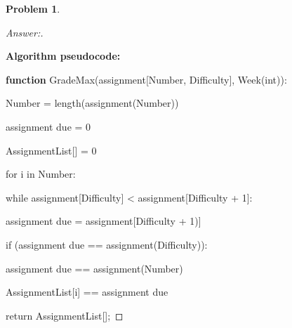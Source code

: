 \documentclass[11pt]{article}
\theoremstyle{definition}
\theoremstyle{definition}
\newtheorem{required}{Problem}
\theoremstyle{definition}
\begin{document}
\begin{required}
\begin{enumerate}[label=(\alph*)]
\begin{proof}[Answer:] \
\item \textbf{Algorithm pseudocode:}
\item \textbf{function} GradeMax(assignment[Number, Difficulty], Week(int)):									
	\item	\hspace*{10mm} Number = length(assignment(Number))
	\item	\hspace*{10mm} assignment due = 0
	\item	\hspace*{10mm} AssignmentList[] = 0

	\item	\hspace*{10mm} for i in Number:
	\item	\hspace*{20mm} while assignment[Difficulty] < assignment[Difficulty + 1]:
	\item	\hspace*{40mm} assignment due = assignment[Difficulty + 1)]
	\item	\hspace*{30mm} if (assignment due == assignment(Difficulty)):
	\item	\hspace*{40mm} assignment due == assignment(Number)
	\item	\hspace*{40mm} AssignmentList[i] == assignment due
	\item	\hspace*{10mm} return AssignmentList[];

\end{proof}

\end{enumerate}
\end{required}




\end{document}
